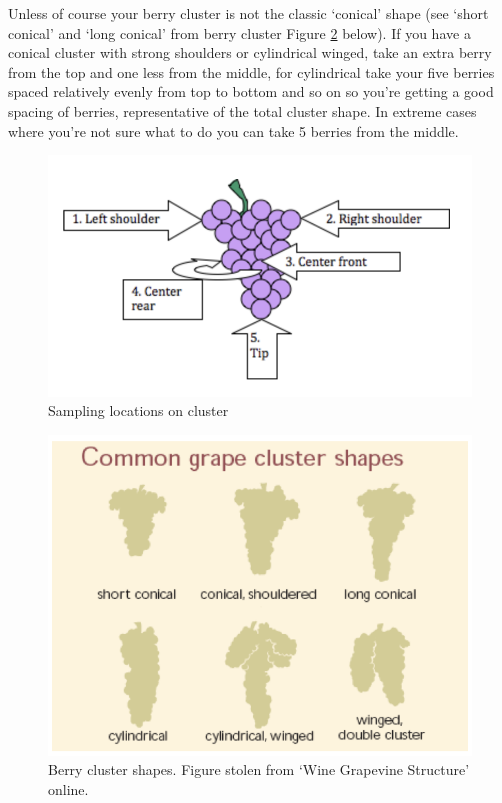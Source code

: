 \documentclass[11pt,letter]{article}
\begin{document}
\begin{enumerate}
Unless of course your berry cluster is not the classic ‘conical’ shape (see ‘short conical’ and ‘long conical’ from berry cluster Figure \ref{fig:clustershapes} below). If you have a conical cluster with strong shoulders or cylindrical winged, take an extra berry from the top and one less from the middle, for cylindrical take your five berries spaced relatively evenly from top to bottom and so on so you’re getting a good spacing of berries, representative of the total cluster shape. In extreme cases where you’re not sure what to do you can take 5 berries from the middle.

\begin{figure} [h]
  \includegraphics[scale = .75]{conecluster.png}
  \caption{Sampling locations on cluster }
  \label{fig:conecluster}
\end{figure}

\begin{figure} [h]
  \includegraphics[scale = .75]{clustershapes}
  \caption{Berry cluster shapes. Figure stolen from ‘Wine Grapevine Structure’ online.}
  \label{fig:clustershapes}
\end{figure}


\end{enumerate}
\end{document}
